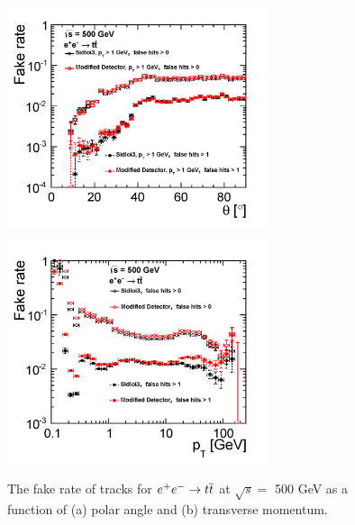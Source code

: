 \begin{figure}
\begin{minipage}{.5\textwidth}
\centering
\includegraphics[width=3.0in]{eettbarFakeRateTheta_sidloi3_det_vtxbar_3doublet.png}
\label{fig:eettbarfakeratetheta}
\end{minipage}
\begin{minipage}{.5\textwidth}
\centering
\includegraphics[width=3.0in]{eettbarFakeRatePt_sidloi3_det_vtxbar_3doublet.png}
\label{fig:eettbarfakeratept}
\end{minipage}
\caption{The fake rate of tracks for $\ee \rightarrow \ttbar$ at $ \sqrt{s} = $ 500 GeV as a function of (a) polar angle and
 (b) transverse momentum.}
\label{fig:eettbarfakerate}
\end{figure}
